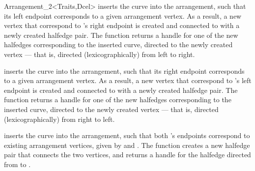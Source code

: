 \begin{ccRefClass}{Arrangement_2<Traits,Dcel>}
  {inserts the curve  into the arrangement, such that its left
   endpoint corresponds to a given arrangement vertex. As a result, a new
   vertex that correspond to 's right endpoint is created and
   connected to  with a newly created halfedge pair. 
   The function returns a handle for one of the new halfedges corresponding
   to the inserted curve, directed to the newly created vertex --- that is,
   directed (lexicographically) from left to right.
   }

  {inserts the curve  into the arrangement, such that its right
   endpoint corresponds to a given arrangement vertex. As a result, a new
   vertex that correspond to 's left endpoint is created and
   connected to  with a newly created halfedge pair. 
   The function returns a handle for one of the new halfedges corresponding
   to the inserted curve, directed to the newly created vertex --- that is,
   directed (lexicographically) from right to left.
   }

  {inserts the curve  into the arrangement, such that both 's
   endpoints correspond to existing arrangement vertices, given by 
   and . The function creates a new halfedge pair that connects the
   two vertices, and returns a handle for the halfedge directed from 
   to .
   }

\begin{ccAdvanced}


\end{ccAdvanced}
\end{ccRefClass}
